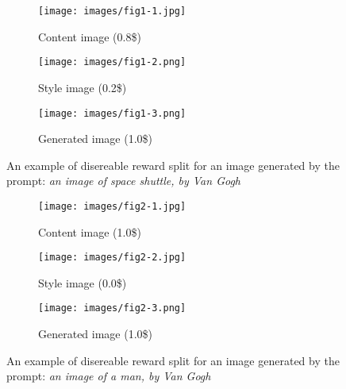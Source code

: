 \documentclass[12pt, letterpaper]{article}
\begin{document}
\begin{figure}[h!]
    \centering
    
    \begin{subfigure}{0.32\textwidth}
        \texttt{[image: images/fig1-1.jpg]}
        \caption{Content image (0.8\$)}
    \end{subfigure}
    \hfill
    \begin{subfigure}{0.32\textwidth}
        \texttt{[image: images/fig1-2.png]}
        \caption{Style image (0.2\$)}
    \end{subfigure}
    \hfill
    \begin{subfigure}{0.32\textwidth}
        \texttt{[image: images/fig1-3.png]}
        \caption{Generated image (1.0\$)}
    \end{subfigure}
    
    \centering
    \caption{An example of disereable reward split for an image generated by the prompt: \textit{an image of space shuttle, by Van Gogh}}
    \label{fig:figure_1}
\end{figure}

\begin{figure}[h!]
    \centering
    
    \begin{subfigure}{0.32\textwidth}
        \texttt{[image: images/fig2-1.jpg]}
        \caption{Content image (1.0\$)}
    \end{subfigure}
    \hfill
    \begin{subfigure}{0.32\textwidth}
        \texttt{[image: images/fig2-2.jpg]}
        \caption{Style image (0.0\$)}
    \end{subfigure}
    \hfill
    \begin{subfigure}{0.32\textwidth}
        \texttt{[image: images/fig2-3.png]}
        \caption{Generated image (1.0\$)}
    \end{subfigure}
    
    \centering
    \caption{An example of disereable reward split for an image generated by the prompt: \textit{an image of a man, by Van Gogh}}
    \label{fig:figure_2}
\end{figure}
\end{document}
